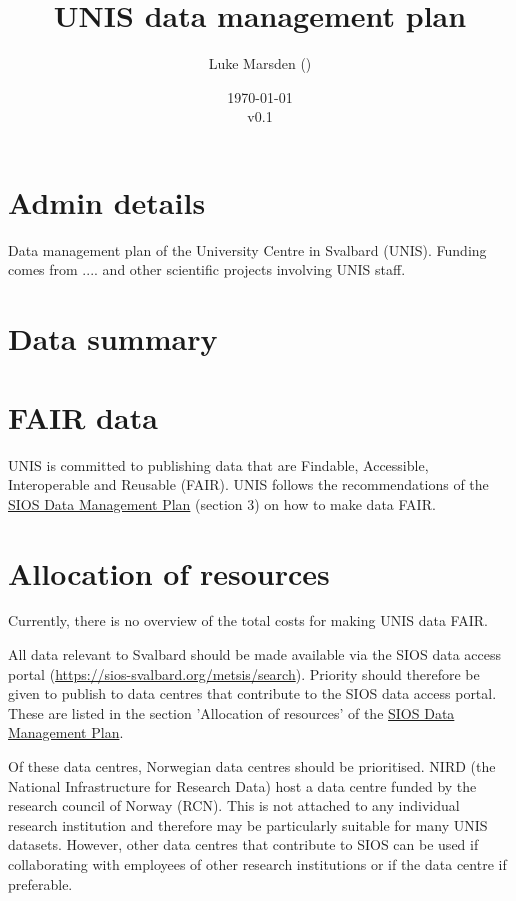 \documentclass[a4paper,english, 11pt]{article}
\title{UNIS data management plan}
\date{\today\\v0.1}
\author{Luke Marsden (\emailme)}
\begin{document}
\maketitle
\tableofcontents

\newpage

\section{Admin details}
\label{s:admin}

Data management plan of the University Centre in Svalbard (UNIS). Funding comes from .... and other scientific projects involving UNIS staff.

\section{Data summary}
\label{s:data}

\section{FAIR data}
\label{s:fair}

UNIS is committed to publishing data that are Findable, Accessible, Interoperable and Reusable (FAIR). UNIS follows the recommendations of the \href{https://sios-svalbard.org/sites/sios-svalbard.org/files/common/SIOS_Data_Management_Plan.pdf}{SIOS Data Management Plan} (section 3) on how to make data FAIR. 

\section{Allocation of resources}
\label{s:resources}

Currently, there is no overview of the total costs for making UNIS data FAIR. 

All data relevant to Svalbard should be made available via the SIOS data access portal (\url{https://sios-svalbard.org/metsis/search}). Priority should therefore be given to publish to data centres that contribute to the SIOS data access portal. These are listed in the section 'Allocation of resources' of the \href{https://sios-svalbard.org/sites/sios-svalbard.org/files/common/SIOS_Data_Management_Plan.pdf}{SIOS Data Management Plan}.

Of these data centres, Norwegian data centres should be prioritised. NIRD (the National Infrastructure for Research Data) host a data centre funded by the research council of Norway (RCN). This is not attached to any individual research institution and therefore may be particularly suitable for many UNIS datasets. However, other data centres that contribute to SIOS can be used if collaborating with employees of other research institutions or if the data centre if preferable.
\end{document}
